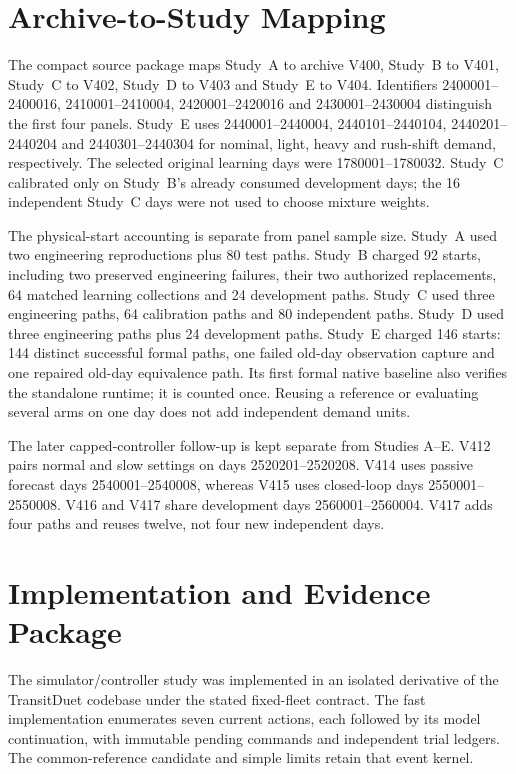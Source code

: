 \section{Archive-to-Study Mapping}
\label{sec:archive}
The compact source package maps Study~A to archive V400, Study~B to V401, Study~C to V402, Study~D to V403 and Study~E to V404. Identifiers 2400001--2400016, 2410001--2410004, 2420001--2420016 and 2430001--2430004 distinguish the first four panels. Study~E uses 2440001--2440004, 2440101--2440104, 2440201--2440204 and 2440301--2440304 for nominal, light, heavy and rush-shift demand, respectively. The selected original learning days were 1780001--1780032. Study~C calibrated only on Study~B's already consumed development days; the 16 independent Study~C days were not used to choose mixture weights.

The physical-start accounting is separate from panel sample size. Study~A used two engineering reproductions plus 80 test paths. Study~B charged 92 starts, including two preserved engineering failures, their two authorized replacements, 64 matched learning collections and 24 development paths. Study~C used three engineering paths, 64 calibration paths and 80 independent paths. Study~D used three engineering paths plus 24 development paths. Study~E charged 146 starts: 144 distinct successful formal paths, one failed old-day observation capture and one repaired old-day equivalence path. Its first formal native baseline also verifies the standalone runtime; it is counted once. Reusing a reference or evaluating several arms on one day does not add independent demand units.

The later capped-controller follow-up is kept separate from Studies A--E.
V412 pairs normal and slow settings on days 2520201--2520208. V414 uses
passive forecast days 2540001--2540008, whereas V415 uses closed-loop days
2550001--2550008. V416 and V417 share development days 2560001--2560004.
V417 adds four paths and reuses twelve, not four new independent days.

\section{Implementation and Evidence Package}
The simulator/controller study was implemented in an isolated derivative of the TransitDuet codebase under the stated fixed-fleet contract. The fast implementation enumerates seven current actions, each followed by its model continuation, with immutable pending commands and independent trial ledgers. The common-reference candidate and simple limits retain that event kernel.

